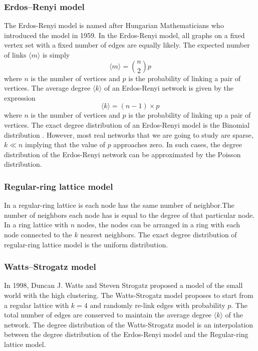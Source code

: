 \documentclass[runningheads]{llncs}
\begin{document}
\subsubsection{Erdos–Renyi model}
The Erdos-Renyi model is named after Hungarian Mathematicians who introduced the model in 1959. In the Erdos-Renyi model, all graphs on a fixed vertex set with a fixed number of edges are equally likely. The expected number of links $\langle m \rangle$ is simply
\begin{equation}
    \langle m \rangle = {n \choose 2} p
\end{equation}
where $n$ is the number of vertices and $p$ is the probability of linking a pair of vertices. The average degree $\langle k \rangle$ of an Erdos-Renyi network is given by the expression 
\begin{equation}
    \langle k \rangle = (n-1) \times p
\end{equation}
where $n$ is the number of vertices and $p$ is the probability of linking up a pair of vertices. The exact degree distribution of an Erdos-Renyi model is the Binomial distribution . However, most real networks that we are going to study are sparse, $k \ll n$ implying that the value of $p$ approaches zero. In such cases, the degree distribution of the Erdos-Renyi network can be approximated by the Poisson distribution.
\subsubsection{Regular-ring lattice model}
In a regular-ring lattice is each node has the same number of neighbor.The number of neighbors each node has is equal to the degree of that particular node. In a ring lattice with $n$ nodes, the nodes can be arranged in a ring with each node connected to the $k$ nearest neighbors. The exact degree distribution of regular-ring lattice model is the uniform distribution. 
\subsubsection{Watts–Strogatz model}
In 1998, Duncan J. Watts and Steven Strogatz proposed a model of the small world with the high clustering. The Watts-Strogatz model proposes to start from a regular lattice with $k=4$ and randomly re-link edges with probability $p$. The total number of edges are conserved to maintain the average degree $\langle k \rangle$ of the network. The degree distribution of the Watts-Strogatz model is an interpolation between the degree distribution of the Erdos-Renyi model and the Regular-ring lattice model.
\end{document}
